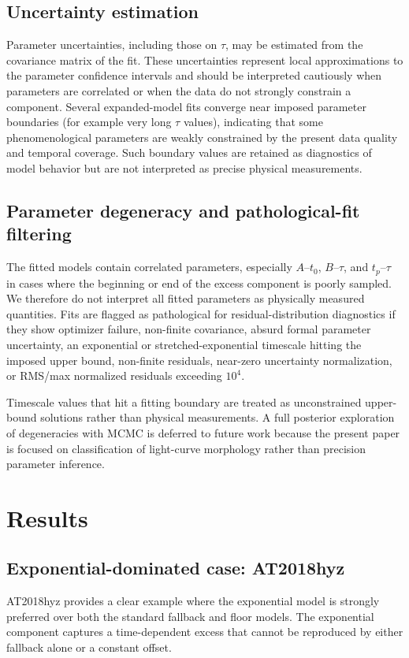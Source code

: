 \documentclass[11pt]{article}
\begin{document}
\subsection{Uncertainty estimation}
Parameter uncertainties, including those on $\tau$, may be estimated from the covariance matrix of the fit. These uncertainties represent local approximations to the parameter confidence intervals and should be interpreted cautiously when parameters are correlated or when the data do not strongly constrain a component. Several expanded-model fits converge near imposed parameter boundaries (for example very long $\tau$ values), indicating that some phenomenological parameters are weakly constrained by the present data quality and temporal coverage. Such boundary values are retained as diagnostics of model behavior but are not interpreted as precise physical measurements.

\subsection{Parameter degeneracy and pathological-fit filtering}
The fitted models contain correlated parameters, especially $A$--$t_0$, $B$--$\tau$, and $t_p$--$\tau$ in cases where the beginning or end of the excess component is poorly sampled. We therefore do not interpret all fitted parameters as physically measured quantities. Fits are flagged as pathological for residual-distribution diagnostics if they show optimizer failure, non-finite covariance, absurd formal parameter uncertainty, an exponential or stretched-exponential timescale hitting the imposed upper bound, non-finite residuals, near-zero uncertainty normalization, or RMS/max normalized residuals exceeding $10^4$.

Timescale values that hit a fitting boundary are treated as unconstrained upper-bound solutions rather than physical measurements. A full posterior exploration of degeneracies with MCMC is deferred to future work because the present paper is focused on classification of light-curve morphology rather than precision parameter inference.

\section{Results}
\subsection{Exponential-dominated case: AT2018hyz}
AT2018hyz provides a clear example where the exponential model is strongly preferred over both the standard fallback and floor models. The exponential component captures a time-dependent excess that cannot be reproduced by either fallback alone or a constant offset.
\end{document}
